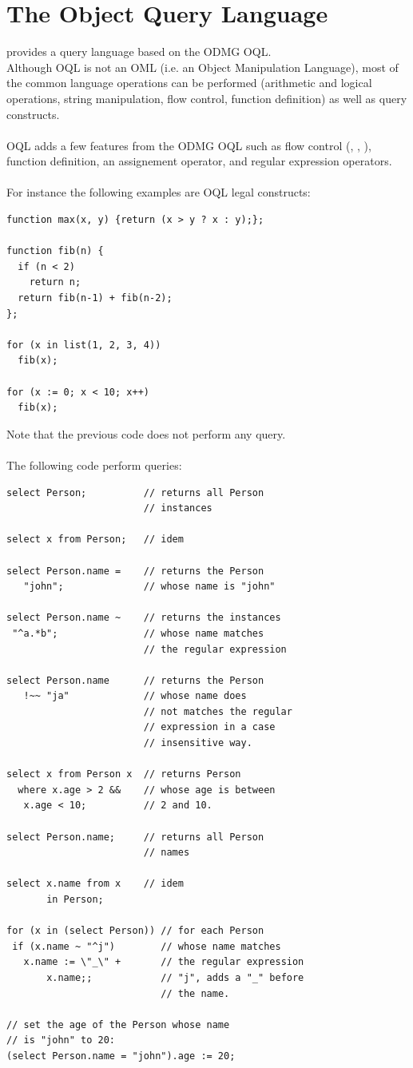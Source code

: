 \section{The Object Query Language}
\eyedb provides a query language based on the ODMG OQL.
\\
Although \eyedb OQL is not an OML (i.e. an Object Manipulation Language),
most of the common language operations can be performed (arithmetic
and logical operations, string manipulation, flow control,
function definition) as well as query constructs.
\\
\\
\eyedb OQL adds a few features from the ODMG OQL such as flow control
(, , ), function definition,
an assignement operator, and regular expression operators.
\\
\\
For instance the following examples are \eyedb OQL legal constructs:
{\verbsize
\begin{verbatim}
function max(x, y) {return (x > y ? x : y);};

function fib(n) {
  if (n < 2)
    return n;
  return fib(n-1) + fib(n-2);
};

for (x in list(1, 2, 3, 4))
  fib(x);

for (x := 0; x < 10; x++)
  fib(x);
\end{verbatim}
}
Note that the previous code does not perform any query.
\\
\\
The following code perform queries:
{\verbsize
\begin{verbatim}
select Person;          // returns all Person
                        // instances

select x from Person;   // idem

select Person.name =    // returns the Person
   "john";              // whose name is "john"

select Person.name ~    // returns the instances
 "^a.*b";               // whose name matches
                        // the regular expression

select Person.name      // returns the Person
   !~~ "ja"             // whose name does
                        // not matches the regular
                        // expression in a case
                        // insensitive way.

select x from Person x  // returns Person 
  where x.age > 2 &&    // whose age is between
   x.age < 10;          // 2 and 10.

select Person.name;     // returns all Person
                        // names

select x.name from x    // idem
       in Person;

for (x in (select Person)) // for each Person
 if (x.name ~ "^j")        // whose name matches
   x.name := \"_\" +       // the regular expression
       x.name;;            // "j", adds a "_" before
                           // the name.

// set the age of the Person whose name
// is "john" to 20:
(select Person.name = "john").age := 20;
\end{verbatim}
}
